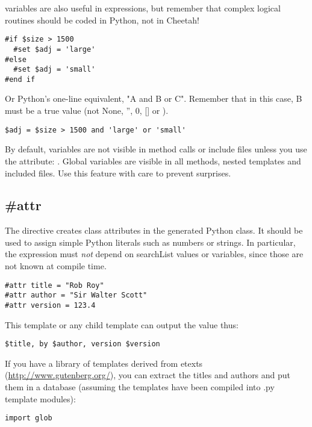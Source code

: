  variables are also useful in  expressions, but
remember that complex logical routines should be coded in Python, not in
Cheetah!
\begin{verbatim}
#if $size > 1500
  #set $adj = 'large'
#else
  #set $adj = 'small'
#end if
\end{verbatim}
Or Python's one-line equivalent, "A and B or C".  Remember that in this case,
B must be a true value (not None, '', 0, [] or {}).  
\begin{verbatim}
$adj = $size > 1500 and 'large' or 'small'
\end{verbatim}

By default,  variables are not visible in method calls or include
files unless you use the  attribute: .  Global variables are visible in all methods, nested templates and
included files.  Use this feature with care to prevent surprises.


\subsection{\#attr}
\label{inheritanceEtc.attr}

The  directive creates class attributes in the generated Python
class.  It should be used to assign simple Python literals such as numbers or
strings.  In particular, the expression must {\em not} depend on searchList
values or  variables, since those are not known at compile time.

\begin{verbatim}
#attr title = "Rob Roy"
#attr author = "Sir Walter Scott"
#attr version = 123.4
\end{verbatim}

This template or any child template can output the value thus:
\begin{verbatim}
$title, by $author, version $version
\end{verbatim}

If you have a library of templates derived from etexts
(\url{http://www.gutenberg.org/}), you can extract the titles and authors
and put them in a database (assuming the templates have been compiled into
.py template modules):

\begin{verbatim}
import glob

\end{verbatim}

